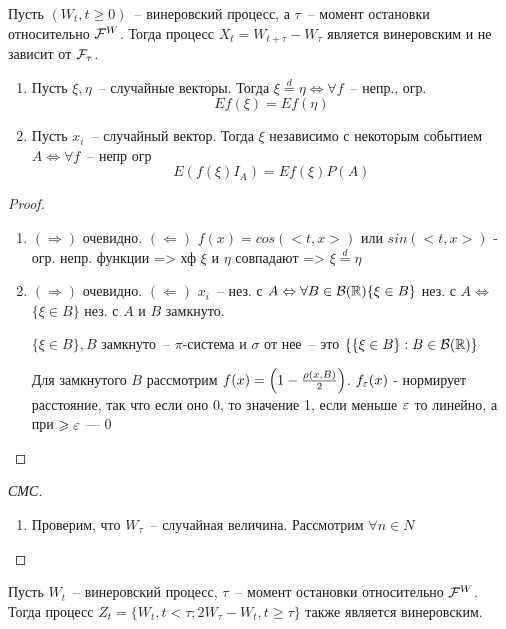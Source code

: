 \begin{theorem}
Пусть $(W_t, t \geq 0)$~-- винеровский процесс, а $\tau$~-- момент
остановки относительно $\mathcal{F}^W$. Тогда процесс
$X_t = W_{t+\tau} - W_\tau$ является винеровским и не зависит от $\mathcal{F}_\tau$.
\end{theorem}
\begin{lem}
\begin{enumerate}
\item Пусть $\xi, \eta$~-- случайные векторы. Тогда $\xi \overset{d}{=} \eta \Leftrightarrow
\forall f$~-- непр., огр.
$$Ef(\xi) = Ef(\eta)$$
\item Пусть $x_i$~-- случайный вектор. Тогда $\xi$ независимо с некоторым событием $A \Leftrightarrow
\forall f$~-- непр огр
$$E(f(\xi)I_A) = Ef(\xi) P(A)$$
\end{enumerate}
\end{lem}
\begin{proof}
\begin{enumerate}
\item $(\Rightarrow)$ очевидно.
$(\Leftarrow)$  $f(x) = cos(<t,x>)$ или $sin(<t, x>)$ - огр. непр. функции => хф $\xi$
и $\eta$ совпадают => $\xi \overset{d}{=} \eta$
\item $(\Rightarrow)$ очевидно.
$(\Leftarrow)$ $x_i$~-- нез. с $A \Leftrightarrow \forall B \in \mathcal{B}(\mathbb{R})
\{\xi \in B\}$ нез. с $A \Leftrightarrow$
$\{\xi \in B\}$ нез. с $A$ и $B$ замкнуто.

$\{\xi \in B\}, B$ замкнуто~-- $\pi$-система и $\sigma$ от нее~--
это $\{\{\xi \in B\}: B \in \mathcal{B}(\mathbb{R})\}$

Для замкнутого $B$ рассмотрим $f(x) = \left( 1 - \frac{\rho(x, B)}{2} \right)$.
$f_\varepsilon(x)$ - нормирует расстояние, так что если оно 0, то значение 1, если меньше $\varepsilon$ то линейно, а при $\geqslant \varepsilon$ --- 0
\end{enumerate}
\end{proof}
\begin{proof}[СМС]
\begin{enumerate}
\item Проверим, что $W_\tau$~-- случайная величина. Рассмотрим $\forall n \in N$
\end{enumerate}
\end{proof}

\begin{theorem}
Пусть $W_t$~-- винеровский процесс, $\tau$~-- момент остановки относительно $\mathcal{F}^W$. Тогда
процесс $Z_t = \{W_t, t < \tau; 2W_\tau - W_t, t \geq \tau\}$ также является винеровским.

\end{theorem}

